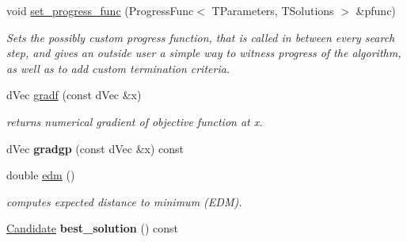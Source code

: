 \begin{DoxyCompactItemize}
\item 
void \hyperlink{classlibcmaes_1_1ESOStrategy_a9d44ba79106b6afbd5881c4f33800840}{set\-\_\-progress\-\_\-func} (Progress\-Func$<$ T\-Parameters, T\-Solutions $>$ \&pfunc)
\begin{DoxyCompactList}\small\item\em Sets the possibly custom progress function, that is called in between every search step, and gives an outside user a simple way to witness progress of the algorithm, as well as to add custom termination criteria. \end{DoxyCompactList}\item 
d\-Vec \hyperlink{classlibcmaes_1_1ESOStrategy_a43bd0b30c43445bc4ee2257963eebf47}{gradf} (const d\-Vec \&x)
\begin{DoxyCompactList}\small\item\em returns numerical gradient of objective function at x. \end{DoxyCompactList}\item 
\hypertarget{classlibcmaes_1_1ESOStrategy_a8a0581ead7ca7fac1f414c92ed030317}{d\-Vec {\bfseries gradgp} (const d\-Vec \&x) const }\label{classlibcmaes_1_1ESOStrategy_a8a0581ead7ca7fac1f414c92ed030317}

\item 
double \hyperlink{classlibcmaes_1_1ESOStrategy_a6350c635353e7b54e78abb223a5d4029}{edm} ()
\begin{DoxyCompactList}\small\item\em computes expected distance to minimum (E\-D\-M). \end{DoxyCompactList}\item 
\hypertarget{classlibcmaes_1_1ESOStrategy_a81441905608aba3daa6d60a78eb47763}{\hyperlink{classlibcmaes_1_1Candidate}{Candidate} {\bfseries best\-\_\-solution} () const }\label{classlibcmaes_1_1ESOStrategy_a81441905608aba3daa6d60a78eb47763}

\end{DoxyCompactItemize}
